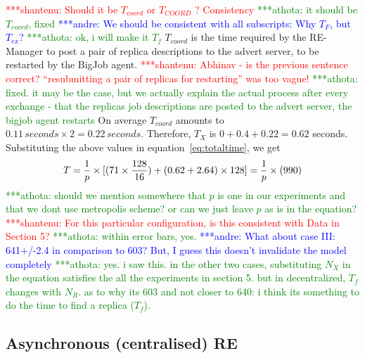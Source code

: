 \documentclass{rspublic}
\newcommand{\jhanote}[1]{ {\textcolor{red} { ***shantenu: #1 }}}
\newcommand{\alnote}[1]{ {\textcolor{blue} { ***andre: #1 }}}
\newcommand{\athotanote}[1]{ {\textcolor{green} { ***athota: #1 }}}
\newcommand{\alnote}[1]{}
\newcommand{\athotanote}[1]{}
\newcommand{\jhanote}[1]{}
\begin{document}
\jhanote{Should it be $T_{coord}$ or $T_{COORD}$ ? Consistency} \athotanote{it should be $T_{coord}$, fixed} \alnote{We should be consistent with all subscripts: Why $T_F$, but $T_{ex}$?} \athotanote{ok, i will make it $T_f$}
$T_{coord}$ is the time required by the RE-Manager to post a pair 
of replica descriptions to the advert server, to be restarted by the BigJob agent. \jhanote{Abhinav - is the previous sentence correct?
  ``resubmitting a pair of replicas for restarting'' was too vague!} \athotanote{fixed. it may be the case, but we actually explain the actual process after every exchange - that the replicas job descriptions are posted to the advert server, the bigjob agent restarts}
On average $T_{coord}$ amounts to $0.11\,seconds \times 2 =
0.22\,seconds$. Therefore, $T_{X}$ is $0+0.4+0.22=0.62$ seconds.
Substituting the above values in equation~\ref{eq:totaltime}, we get
\begin{eqnarray}
  T=  {1 \over p} \times {[ {(71\times {128\over 16}})+ (0.62 + 2.64)\times 128]} = {1 \over p} \times (990)
\label{eq:sync}
\end{eqnarray}
\athotanote{should we mention somewhere that $p$ is one in our experiments and that we dont use metropolis scheme? or can we just leave $p$ as is in the equation?}
\jhanote{For this particular configuration, is this consistent with
  Data in Section 5?} \athotanote{within error bars, yes.} 
  \alnote{What about case III: 641+/-2.4 in comparison to 603? But, I guess this doesn't invalidate the model completely}
  \athotanote{yes. i saw this. in the other two cases, substituting $N_X$ in the equation satisfies the all the experiments in section 5. but in decentralized, $T_f$ changes with $N_R$. as to why its 603 and not closer to 640: i think its something to do the time to find a replica ($T_f$).}

\subsection{Asynchronous (centralised) RE}


\end{document}
